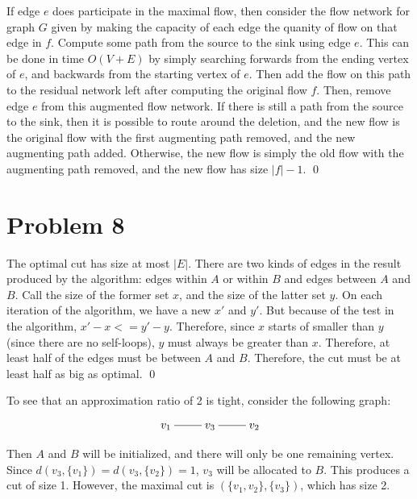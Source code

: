 \documentclass[twoside]{amsart}
\begin{document}
If edge $e$ does participate in the maximal flow, then consider the
flow network for graph $G$ given by making the capacity of each edge
the quanity of flow on that edge in $f$. Compute some path from the
source to the sink using edge $e$.  This can be done in time $O(V+E)$
by simply searching forwards from the ending vertex of $e$, and
backwards from the starting vertex of $e$.  Then add the flow on this
path to the residual network left after computing the original flow
$f$.  Then, remove edge $e$ from this augmented flow network.  If
there is still a path from the source to the sink, then it is possible
to route around the deletion, and the new flow is the original flow
with the first augmenting path removed, and the new augmenting path
added.  Otherwise, the new flow is simply the old flow with the
augmenting path removed, and the new flow has size $|f|-1$.
\qed

\section*{Problem 8}

The optimal cut has size at most $|E|$.  There are two kinds of
edges in the result produced by the algorithm: edges within $A$ or
within $B$ and edges between $A$ and $B$.  Call the size of the former
set $x$, and the size of the latter set $y$.  On each iteration of the
algorithm, we have a new $x'$ and $y'$.  But because of the test in
the algorithm, $x' - x <= y' - y$.  Therefore, since $x$ starts of
smaller than $y$ (since there are no self-loops), $y$ must always be
greater than $x$.  Therefore, at least half of the edges must be
between $A$ and $B$.  Therefore, the cut must be at least half as big
as optimal.  \qed 

To see that an approximation ratio of 2 is tight, consider the
following graph:

\[\xymatrix{
  v_1 \ar@{-}[r] & v_3 \ar@{-}[r] & v_2
}\]

Then $A$ and $B$ will be initialized, and there will only be one
remaining vertex.  Since $d(v_3,\{v_1\}) = d(v_3,\{v_2\}) = 1$, $v_3$
will be allocated to $B$.  This produces a cut of size 1.  However,
the maximal cut is $(\{v_1,v_2\},\{v_3\})$, which has size 2.
\end{document}
